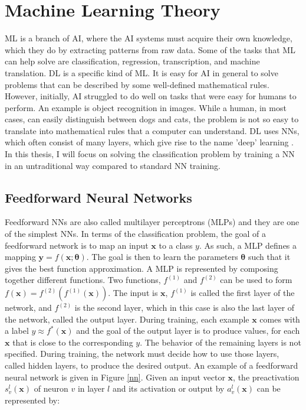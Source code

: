 \section{Machine Learning Theory}
ML is a branch of AI, where the AI systems must acquire their own knowledge, which they do by extracting patterns from raw data. Some of the tasks that ML can help solve are classification, regression, transcription, and machine translation. DL is a specific kind of ML. It is easy for AI in general to solve problems that can be described by some well-defined mathematical rules. However, initially, AI struggled to do well on tasks that were easy for humans to perform. An example is object recognition in images. While a human, in most cases, can easily distinguish between dogs and cats, the problem is not so easy to translate into mathematical rules that a computer can understand. DL uses NNs, which often consist of many layers, which give rise to the name 'deep' learning \citep{goodfellow2016}. In this thesis, I will focus on solving the classification problem by training a NN in an untraditional way compared to standard NN training. 

\subsection{Feedforward Neural Networks}
Feedforward NNs are also called multilayer perceptrons (MLPs) and they are one of the simplest NNs. In terms of the classification problem, the goal of a feedforward network is to map an input $\mathbf{x}$ to a class $y$. As such, a MLP defines a mapping $\mathbf{y} = f(\mathbf{x}; \boldsymbol{\theta})$. The goal is then to learn the parameters $\boldsymbol{\theta}$ such that it gives the best function approximation. A MLP is represented by composing together different functions. Two functions, $f^{(1)}$ and $f^{(2)}$ can be used to form $f(\mathbf{x}) = f^{(2)}(f^{(1)}(\mathbf{x}))$. The input is $\mathbf{x}$, $f^{(1)}$ is called the first layer of the network, and $f^{(2)}$ is the second layer, which in this case is also the last layer of the network, called the output layer. During training, each example $\mathbf{x}$ comes with a label $y \approx f^*(\mathbf{x})$ and the goal of the output layer is to produce values, for each $\mathbf{x}$ that is close to the corresponding $y$. The behavior of the remaining layers is not specified. During training, the network must decide how to use those layers, called hidden layers, to produce the desired output. An example of a feedforward neural network is given in Figure \ref{nn}. Given an input vector $\mathbf{x}$, the preactivation $s_{v}^l(\mathbf{x})$ of neuron $v$ in layer $l$ and its activation or output by $a_{v}^l(\mathbf{x})$ can be represented by:

